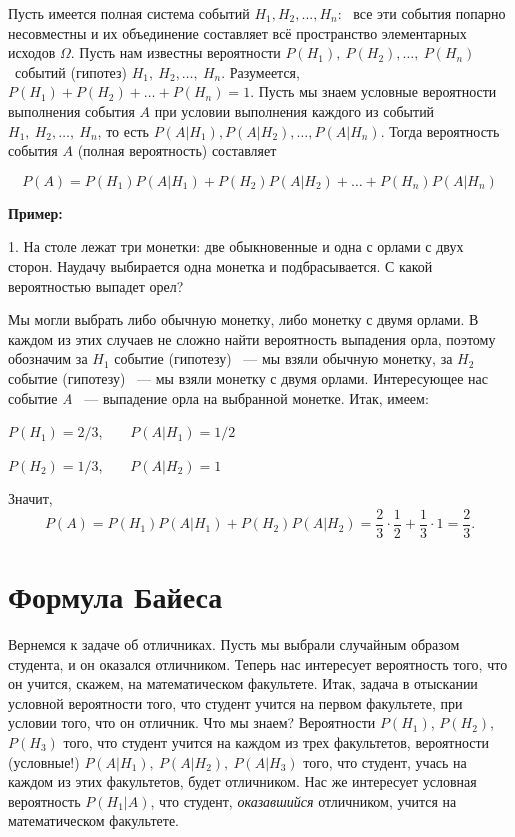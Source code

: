 \documentclass[11pt]{article}
\begin{document}
Пусть имеется полная система событий $ {H_{1}, H_{2},..., H_{n}} $:~  все эти события попарно несовместны и их объединение составляет всё пространство элементарных исходов $\Omega$. Пусть нам известны вероятности $P(H_{1}),~P(H_{2}),\dots,~ P(H_{n})$~событий (гипотез) $H_{1},~ H_{2},\dots,~H_{n}$. Разумеется, $P(H_{1})+ P(H_{2})+\dots+ P(H_{n})=1$.  Пусть мы знаем условные вероятности выполнения события $A$ при условии выполнения каждого из событий $H_{1}, ~H_{2},\dots,~ H_{n}$, то есть $P(A|H_{1}),P(A|H_{2}),\dots, P(A|H_{n})$. Тогда вероятность события $A$ (полная вероятность) составляет

$$P(A)=P(H_{1})P(A|H_{1})+P(H_{2})P(A|H_{2})+\dots+P(H_{n})P(A|H_{n})$$



\textbf{Пример:}

1. На столе лежат три монетки: две обыкновенные и одна с орлами с двух сторон. Наудачу выбирается одна монетка и подбрасывается. С какой вероятностью выпадет орел?

Мы могли выбрать либо обычную монетку, либо монетку с двумя орлами. В каждом из этих случаев не сложно найти вероятность выпадения орла, поэтому обозначим за $H_{1}$ событие (гипотезу) ~--- мы взяли обычную монетку, за $H_{2}$ событие (гипотезу) ~--- мы взяли монетку с двумя орлами. Интересующее нас событие \textit{A} ~--- выпадение орла на выбранной монетке. Итак, имеем:

\vspace{1em}

$P(H_{1})=2/3$,~~~~$P(A|H_{1})=1/2$

$P(H_{2})=1/3$,~~~~$P(A|H_{2})=1$

\vspace{1em}

Значит, $$P(A)=P(H_{1})P(A|H_{1})+P(H_{2})P(A|H_{2})=\frac{2}{3}\cdot\frac{1}{2}+\frac{1}{3}\cdot1=\frac{2}{3}.$$

\section{Формула Байеса}

Вернемся к задаче об отличниках. Пусть мы выбрали случайным образом студента, и он оказался отличником. Теперь нас интересует вероятность того, что он учится, скажем, на математическом факультете. Итак, задача в отыскании условной вероятности того, что студент учится на первом факультете, при условии того, что он отличник. Что мы знаем? Вероятности $P(H_{1})$, $P(H_{2})$, $P(H_{3})$  того, что студент учится на каждом из трех факультетов, вероятности (условные!) $P(A|H_{1}),~P(A|H_{2}),~P(A|H_{3})$ того, что студент, учась на каждом из этих факультетов, будет отличником. Нас же интересует условная вероятность $P(H_{1}|A)$, что студент, \textit{оказавшийся} отличником, учится на математическом факультете.
\end{document}
